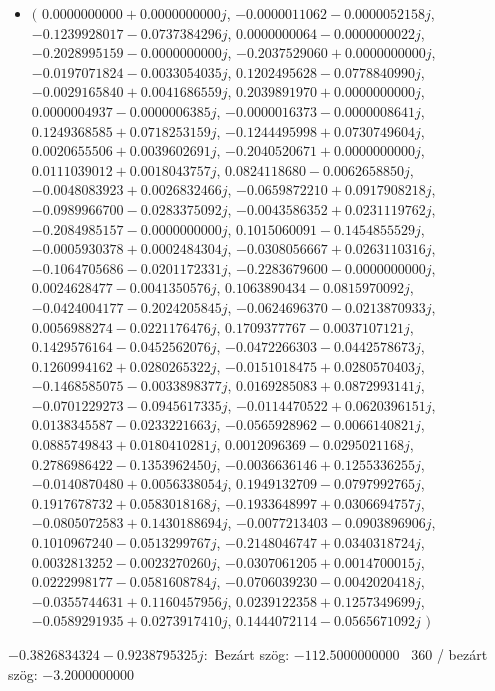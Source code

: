 \documentclass[14pt,a4paper]{article}
\begin{document}
\begin{itemize}
\item
$\big($
$0.0000000000+0.0000000000j$, $-0.0000011062-0.0000052158j$, $-0.1239928017-0.0737384296j$, $0.0000000064-0.0000000022j$, $-0.2028995159-0.0000000000j$, $-0.2037529060+0.0000000000j$, $-0.0197071824-0.0033054035j$, $0.1202495628-0.0778840990j$, $-0.0029165840+0.0041686559j$, $0.2039891970+0.0000000000j$, $0.0000004937-0.0000006385j$, $-0.0000016373-0.0000008641j$, $0.1249368585+0.0718253159j$, $-0.1244495998+0.0730749604j$, $0.0020655506+0.0039602691j$, $-0.2040520671+0.0000000000j$, $0.0111039012+0.0018043757j$, $0.0824118680-0.0062658850j$, $-0.0048083923+0.0026832466j$, $-0.0659872210+0.0917908218j$, $-0.0989966700-0.0283375092j$, $-0.0043586352+0.0231119762j$, $-0.2084985157-0.0000000000j$, $0.1015060091-0.1454855529j$, $-0.0005930378+0.0002484304j$, $-0.0308056667+0.0263110316j$, $-0.1064705686-0.0201172331j$, $-0.2283679600-0.0000000000j$, $0.0024628477-0.0041350576j$, $0.1063890434-0.0815970092j$, $-0.0424004177-0.2024205845j$, $-0.0624696370-0.0213870933j$, $0.0056988274-0.0221176476j$, $0.1709377767-0.0037107121j$, $0.1429576164-0.0452562076j$, $-0.0472266303-0.0442578673j$, $0.1260994162+0.0280265322j$, $-0.0151018475+0.0280570403j$, $-0.1468585075-0.0033898377j$, $0.0169285083+0.0872993141j$, $-0.0701229273-0.0945617335j$, $-0.0114470522+0.0620396151j$, $0.0138345587-0.0233221663j$, $-0.0565928962-0.0066140821j$, $0.0885749843+0.0180410281j$, $0.0012096369-0.0295021168j$, $0.2786986422-0.1353962450j$, $-0.0036636146+0.1255336255j$, $-0.0140870480+0.0056338054j$, $0.1949132709-0.0797992765j$, $0.1917678732+0.0583018168j$, $-0.1933648997+0.0306694757j$, $-0.0805072583+0.1430188694j$, $-0.0077213403-0.0903896906j$, $0.1010967240-0.0513299767j$, $-0.2148046747+0.0340318724j$, $0.0032813252-0.0023270260j$, $-0.0307061205+0.0014700015j$, $0.0222998177-0.0581608784j$, $-0.0706039230-0.0042020418j$, $-0.0355744631+0.1160457956j$, $0.0239122358+0.1257349699j$, $-0.0589291935+0.0273917410j$, $0.1444072114-0.0565671092j$
$\big)$
\end{itemize}
$-0.3826834324-0.9238795325j$:\
Bezárt szög: $-112.5000000000$ \
360 / bezárt szög: $-3.2000000000$\
\end{document}
